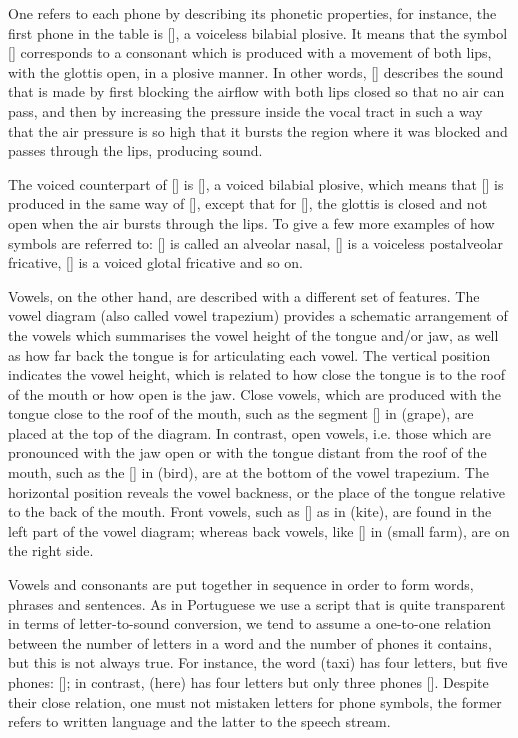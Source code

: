 One refers to each phone by describing its phonetic properties, for instance, the first phone in the table is [], a voiceless bilabial plosive. It means that the symbol [] corresponds to a consonant which is produced with a movement of both lips, with the glottis open, in a plosive manner. In other words, [] describes the sound that is made by first blocking the airflow with both lips closed so that no air can pass, and then by increasing the pressure inside the vocal tract in such a way that the air pressure is so high that it bursts the region where it was blocked and passes through the lips, producing sound.

The voiced counterpart of [] is [], a voiced bilabial plosive, which means that [] is produced in the same way of [], except that for [], the glottis is closed and not open when the air bursts through the lips. To give a few more examples of how symbols are referred to: [] is called an alveolar nasal, [] is a voiceless postalveolar fricative, [] is a voiced glotal fricative and so on.

Vowels, on the other hand, are described with a different set of features. The vowel diagram (also called vowel trapezium) provides a schematic arrangement of the vowels which summarises the vowel height of the tongue and/or jaw, as well as how far back the tongue is for articulating each vowel. The vertical position indicates the vowel height, which is related to how close the tongue is to the roof of the mouth or how open is the jaw. Close vowels, which are produced with the tongue close to the roof of the mouth, such as the segment [] in  (grape), are placed at the top of the diagram. In contrast, open vowels, i.e. those which are pronounced with the jaw open or with the tongue distant from the roof of the mouth, such as the [] in  (bird), are at the bottom of the vowel trapezium. The horizontal position reveals the vowel backness, or the place of the tongue relative to the back of the mouth. Front vowels, such as [] as in  (kite), are found in the left part of the vowel diagram; whereas back vowels, like [] in  (small farm), are on the right side.

Vowels and consonants are put together in sequence in order to form words, phrases and sentences. As in Portuguese we use a script that is quite transparent in terms of letter-to-sound conversion, we tend to assume a one-to-one relation between the number of letters in a word and the number of phones it contains, but this is not always true. For instance, the word  (taxi) has four letters, but five phones: []; in contrast,  (here) has four letters but only three phones []. Despite their close relation, one must not mistaken letters for phone symbols, the former refers to written language and the latter to the speech stream.

